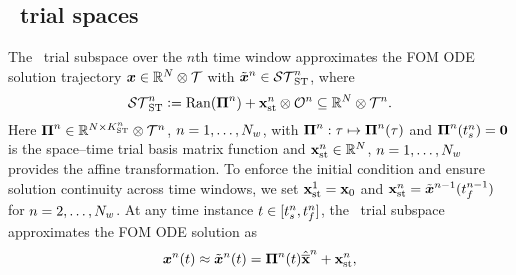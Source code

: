 \subsection{\spaceTimeAcronym\ trial spaces}\label{sec:wls_spacetime}

The \spaceTimeAcronym\ trial subspace over the $n$th time window approximates
the FOM ODE solution trajectory ${\boldsymbol x}\in\mathbb{R}^{N}\otimes\mathcal{T}$
with $\tilde{\boldsymbol x}^{n} \in \mathcal{ ST }_{\text{ST}}^{n}$, where
\begin{equation}\label{eq:st_sttrialspace}
 \mathcal{ ST }_{\text{ST}}^{n} \vcentcolon=
 \mathrm{Ran}(\boldsymbol \Pi^{n}) + \mathbf{x}_\text{st}^{n}\otimes \mathcal{O}^{n} \subseteq \mathbb{R}^{N} \otimes \mathcal{T}^{n}.
\end{equation}
Here $\boldsymbol \Pi^{n} \in \mathbb{R}^{N \times
K_{\text{ST}}^{n}}\otimes\mathcal{T}^{n}$, $n=1,\ldots,N_w$, with $\boldsymbol \Pi^{n}: \tau \mapsto \boldsymbol \Pi^{n}(\tau)$ and $\boldsymbol \Pi^{n}(t_s^{n}) = \boldsymbol 0$ is the space--time trial basis matrix {function} and $\mathbf{x}_\text{st}^{n} \in \mathbb{R}^{N}$, $n=1,\ldots,N_w$ provides the affine transformation. 
To enforce the initial condition and ensure solution continuity across time windows, we set $\mathbf{x}_\text{st}^{1} = {{\mathbf{x}}_0}$ and
$\mathbf{x}_\text{st}^{n} = \tilde{\boldsymbol x}^{n-1}(t_f^{n-1})$ for
$n=2,\ldots,N_w$.
At any time instance $t \in [t_s^{n},t_f^{n}]$, the \spaceTimeAcronym\ trial subspace approximates the FOM ODE solution as
 \begin{equation}\label{eq:stapprox}
 {\boldsymbol x}^{n}(t) \approx \tilde{\boldsymbol x}^{n}(t)  = \boldsymbol \Pi^{n}(t) \hat{\mathbf{\overline{x}}}^{n} + \mathbf{x}_\text{st}^{n},
\end{equation}
